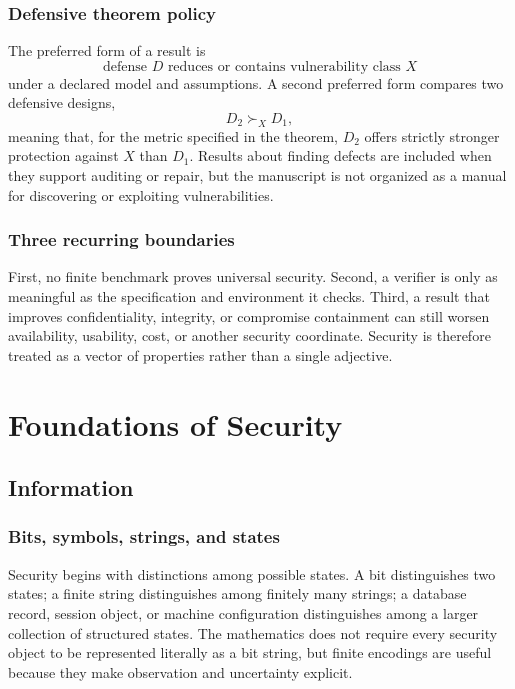 \documentclass[11pt,oneside]{book}
\theoremstyle{definition}
\theoremstyle{remark}
\begin{document}
\section*{Defensive theorem policy}
The preferred form of a result is
\[
\text{defense }D\text{ reduces or contains vulnerability class }X
\]
under a declared model and assumptions. A second preferred form compares two defensive designs,
\[
D_2 \succ_X D_1,
\]
meaning that, for the metric specified in the theorem, $D_2$ offers strictly stronger protection against $X$ than $D_1$. Results about finding defects are included when they support auditing or repair, but the manuscript is not organized as a manual for discovering or exploiting vulnerabilities.

\section*{Three recurring boundaries}
First, no finite benchmark proves universal security. Second, a verifier is only as meaningful as the specification and environment it checks. Third, a result that improves confidentiality, integrity, or compromise containment can still worsen availability, usability, cost, or another security coordinate. Security is therefore treated as a vector of properties rather than a single adjective.

\tableofcontents

\mainmatter
\part{Foundations of Security}

\chapter{Information}
\label{ch:information}
\section{Bits, symbols, strings, and states}
Security begins with distinctions among possible states. A bit distinguishes two states; a finite string distinguishes among finitely many strings; a database record, session object, or machine configuration distinguishes among a larger collection of structured states. The mathematics does not require every security object to be represented literally as a bit string, but finite encodings are useful because they make observation and uncertainty explicit.
\end{document}

